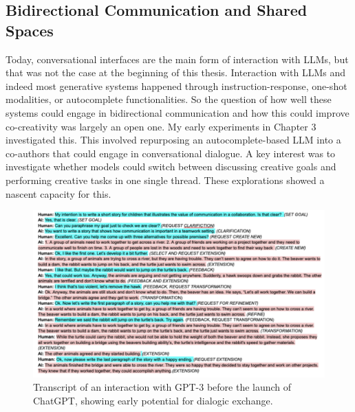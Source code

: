\subsection{Bidirectional Communication and Shared Spaces}
Today, conversational interfaces are the main form of interaction with LLMs, but that was not the case at the beginning of this thesis. Interaction with LLMs and indeed most generative systems happened through instruction-response, one-shot modalities, or autocomplete functionalities. So the question of how well these systems could engage in bidirectional communication and how this could improve co-creativity was largely an open one.  My early experiments in Chapter 3 investigated this. This involved repurposing an autocomplete-based LLM into a co-authors that could engage in conversational dialogue. A key interest was to investigate whether models could switch between discussing creative goals and performing creative tasks in one single thread. These explorations showed a nascent capacity for this.
\begin{figure}[H]
    \centering
    \includegraphics[width=1\linewidth]{transcriptgenchi.png}
    \caption{Transcript of an interaction with GPT-3 before the launch of ChatGPT, showing early potential for dialogic exchange.}
    \label{fig:genchi_transcript}
\end{figure}

